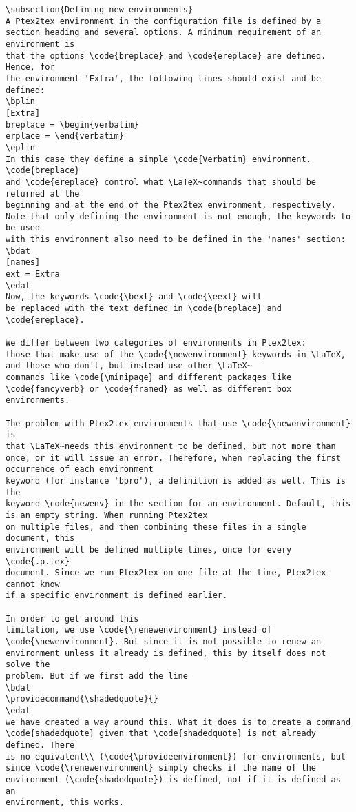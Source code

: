 \documentclass[a4paper,11pt]{article}
\begin{document}
{\begin{Verbatim}
\subsection{Defining new environments}
A Ptex2tex environment in the configuration file is defined by a
section heading and several options. A minimum requirement of an environment is
that the options \code{breplace} and \code{ereplace} are defined. Hence, for
the environment 'Extra', the following lines should exist and be defined:
\bplin
[Extra]
breplace = \begin{verbatim}
erplace = \end{verbatim}
\eplin
In this case they define a simple \code{Verbatim} environment. \code{breplace}
and \code{ereplace} control what \LaTeX~commands that should be returned at the
beginning and at the end of the Ptex2tex environment, respectively.
Note that only defining the environment is not enough, the keywords to be used
with this environment also need to be defined in the 'names' section:
\bdat
[names]
ext = Extra
\edat
Now, the keywords \code{\bext} and \code{\eext} will
be replaced with the text defined in \code{breplace} and \code{ereplace}.

We differ between two categories of environments in Ptex2tex:
those that make use of the \code{\newenvironment} keywords in \LaTeX,
and those who don't, but instead use other \LaTeX~
commands like \code{\minipage} and different packages like
\code{fancyverb} or \code{framed} as well as different box environments.

The problem with Ptex2tex environments that use \code{\newenvironment} is
that \LaTeX~needs this environment to be defined, but not more than
once, or it will issue an error. Therefore, when replacing the first occurrence of each environment
keyword (for instance 'bpro'), a definition is added as well. This is the
keyword \code{newenv} in the section for an environment. Default, this
is an empty string. When running Ptex2tex
on multiple files, and then combining these files in a single document, this
environment will be defined multiple times, once for every \code{.p.tex}
document. Since we run Ptex2tex on one file at the time, Ptex2tex cannot know
if a specific environment is defined earlier.

In order to get around this
limitation, we use \code{\renewenvironment} instead of
\code{\newenvironment}. But since it is not possible to renew an
environment unless it already is defined, this by itself does not solve the
problem. But if we first add the line
\bdat
\providecommand{\shadedquote}{}
\edat
we have created a way around this. What it does is to create a command
\code{shadedquote} given that \code{shadedquote} is not already defined. There
is no equivalent\\ (\code{\provideenvironment}) for environments, but
since \code{\renewenvironment} simply checks if the name of the
environment (\code{shadedquote}) is defined, not if it is defined as an
environment, this works.


\end{Verbatim}}
\end{document}
